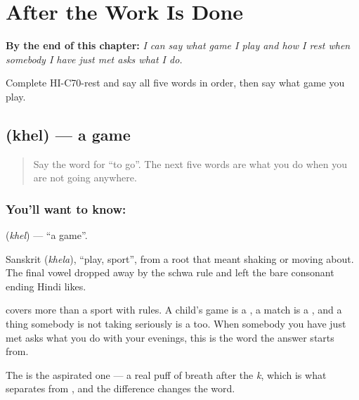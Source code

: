 
\chapter{After the Work Is Done}
\label{ch:hi-after-the-work-is-done}

\begin{chapteropening}
\textbf{By the end of this chapter:} \emph{I can say what game I play and how I rest when somebody I have just met asks what I do.}

Complete HI-C70-rest and say all five words in order, then say what game you play.
\end{chapteropening}

\section[khel]{ (khel) — a game}

\label{lesson:HI-C70-game}



\begin{quote}
Say the word for \textquotedblleft{}to go\textquotedblright{}. The next five words are what you do when you are not going anywhere.
\end{quote}

\subsection*{You'll want to know: }
\textbf{} (\emph{khel}) — \textquotedblleft{}a game\textquotedblright{}.

Sanskrit  (\emph{khela}), \textquotedblleft{}play, sport\textquotedblright{}, from a root that meant shaking or moving about. The final vowel dropped away by the schwa rule and left the bare consonant ending Hindi likes.

 covers more than a sport with rules. A child's game is a , a match is a , and a thing somebody is not taking seriously is a  too. When somebody you have just met asks what you do with your evenings, this is the word the answer starts from.

The \textbf{} is the aspirated one — a real puff of breath after the \emph{k}, which is what separates  from , and the difference changes the word.

